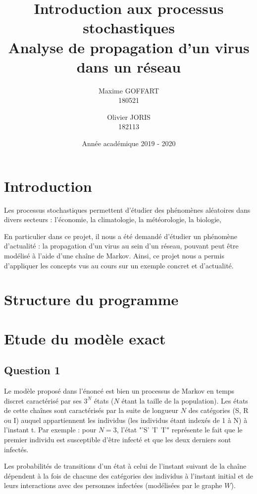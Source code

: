 \documentclass[a4paper, 12pt, oneside]{article}
\title{\textbf{Introduction aux processus stochastiques}\\
	   Analyse de propagation d'un virus dans un réseau}
\author{Maxime GOFFART \\180521 \and Olivier JORIS\\182113}
\date{Année académique 2019 - 2020}
\begin{document}
\maketitle
\newpage

\tableofcontents
\newpage

\section{Introduction}

Les processus stochastiques permettent d'étudier des phénomènes aléatoires dans divers secteurs : l'économie, la climatologie, la météorologie, la biologie, \dotso

En particulier dans ce projet, il nous a été demandé d'étudier un phénomène d'actualité : la propagation d'un virus au sein d'un réseau, pouvant peut être modélisé à l'aide d'une chaîne de Markov. Ainsi, ce projet nous a permis d'appliquer les concepts vus au cours sur un exemple concret et d'actualité.

\section{Structure du programme} %

\section{Etude du modèle exact}

\subsection{Question 1}
	
	Le modèle proposé dans l'énoncé est bien un processus de Markov en temps discret caractérisé par ses $3^N$ états ($N$ étant la taille de la population). Les états de cette chaînes sont caractérisés par la suite de longueur $N$ des catégories (S, R ou I) auquel appartiennent les individus (les individus étant indexés de 1 à N) à l'instant t. Par exemple : pour $N = 3$, l'état "'S' 'I' 'I'" représente le fait que le premier individu est susceptible d'être infecté et que les deux derniers sont infectés.
	
	 Les probabilités de transitions d'un état à celui de l'instant suivant de la chaîne dépendent à la fois de chacune des catégories des individus à l'instant initial et de leurs interactions avec des personnes infectées (modélisées par le graphe $W$).
	
\end{document}
